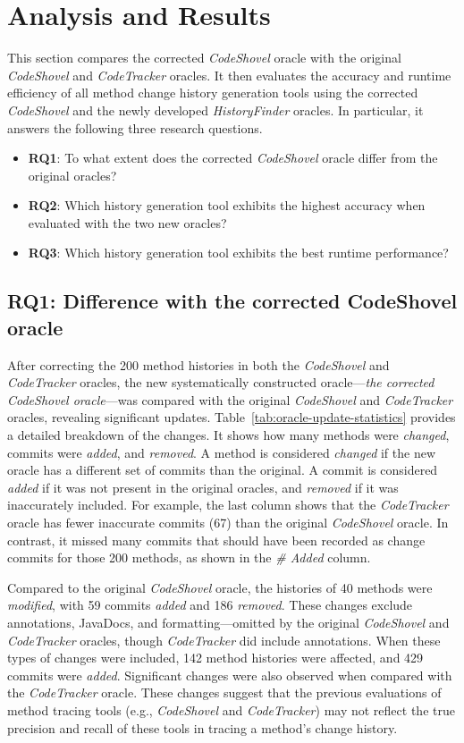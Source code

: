 \section{Analysis and Results}
\label{sec:result-and-analysis}
This section compares the corrected \textit{CodeShovel} oracle with the original \textit{CodeShovel} and \textit{CodeTracker} oracles. It then evaluates the accuracy and runtime efficiency of all method change history generation tools using the corrected \textit{CodeShovel} and the newly developed \textit{HistoryFinder} oracles. In particular, it answers the following three research questions.
\begin{itemize}
    \item \textbf{RQ1}: To what extent does the corrected \textit{CodeShovel} oracle differ from the original oracles?
    \item \textbf{RQ2}: Which history generation tool exhibits the highest accuracy when evaluated with the two new oracles?
    \item \textbf{RQ3}: Which history generation tool exhibits the best runtime performance?
\end{itemize}
\subsection{RQ1: Difference with the corrected CodeShovel oracle}

After correcting the 200 method histories in both the \textit{CodeShovel} and \textit{CodeTracker} oracles, the new systematically constructed oracle—\emph{the corrected CodeShovel oracle}—was compared with the original \textit{CodeShovel} and \textit{CodeTracker} oracles, revealing significant updates. Table~\ref{tab:oracle-update-statistics} provides a detailed breakdown of the changes. It shows how many methods were \emph{changed}, commits were \emph{added}, and \emph{removed}. A method is considered \emph{changed} if the new oracle has a different set of commits than the original. A commit is considered \emph{added} if it was not present in the original oracles, and \emph{removed} if it was inaccurately included. For example, the last column shows that the \textit{CodeTracker} oracle has fewer inaccurate commits (67) than the original \textit{CodeShovel} oracle. In contrast, it missed many commits that should have been recorded as change commits for those 200 methods, as shown in the \emph{\# Added} column.

Compared to the original \textit{CodeShovel} oracle, the histories of 40 methods were \emph{modified}, with 59 commits \emph{added} and 186 \emph{removed}. These changes exclude annotations, JavaDocs, and formatting—omitted by the original \textit{CodeShovel} and \textit{CodeTracker} oracles, though \textit{CodeTracker} did include annotations. When these types of changes were included, 142 method histories were affected, and 429 commits were \emph{added}. Significant changes were also observed when compared with the \textit{CodeTracker} oracle. These changes suggest that the previous evaluations of method tracing tools (e.g., \textit{CodeShovel} and \textit{CodeTracker}) may not reflect the true precision and recall of these tools in tracing a method's change history.


